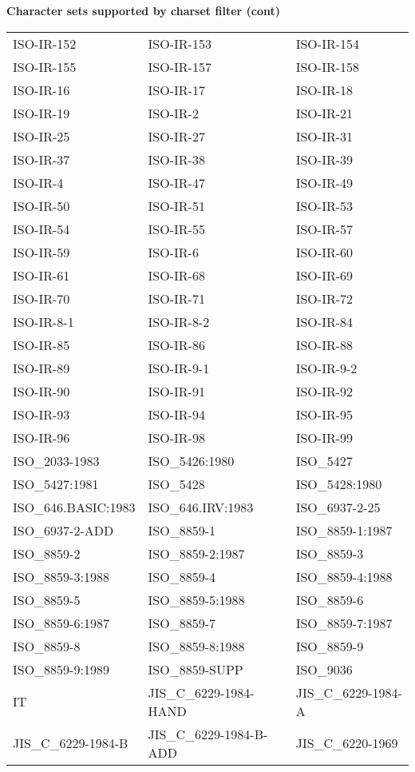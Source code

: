 \clearpage
{\bf Character sets supported by charset filter (cont)}
\bigskip\bigskip\noindent

\begin {tabular} {l l l}
ISO-IR-152 & ISO-IR-153 & ISO-IR-154 \\
ISO-IR-155 & ISO-IR-157 & ISO-IR-158 \\
ISO-IR-16 & ISO-IR-17 & ISO-IR-18 \\
ISO-IR-19 & ISO-IR-2 & ISO-IR-21 \\
ISO-IR-25 & ISO-IR-27 & ISO-IR-31 \\
ISO-IR-37 & ISO-IR-38 & ISO-IR-39 \\
ISO-IR-4 & ISO-IR-47 & ISO-IR-49 \\
ISO-IR-50 & ISO-IR-51 & ISO-IR-53 \\
ISO-IR-54 & ISO-IR-55 & ISO-IR-57 \\
ISO-IR-59 & ISO-IR-6 & ISO-IR-60 \\
ISO-IR-61 & ISO-IR-68 & ISO-IR-69 \\
ISO-IR-70 & ISO-IR-71 & ISO-IR-72 \\
ISO-IR-8-1 & ISO-IR-8-2 & ISO-IR-84 \\
ISO-IR-85 & ISO-IR-86 & ISO-IR-88 \\
ISO-IR-89 & ISO-IR-9-1 & ISO-IR-9-2 \\
ISO-IR-90 & ISO-IR-91 & ISO-IR-92 \\
ISO-IR-93 & ISO-IR-94 & ISO-IR-95 \\
ISO-IR-96 & ISO-IR-98 & ISO-IR-99 \\
ISO\_2033-1983 & ISO\_5426:1980 & ISO\_5427 \\
ISO\_5427:1981 & ISO\_5428 & ISO\_5428:1980 \\
ISO\_646.BASIC:1983 & ISO\_646.IRV:1983 & ISO\_6937-2-25 \\
ISO\_6937-2-ADD & ISO\_8859-1 & ISO\_8859-1:1987 \\
ISO\_8859-2 & ISO\_8859-2:1987 & ISO\_8859-3 \\
ISO\_8859-3:1988 & ISO\_8859-4 & ISO\_8859-4:1988 \\
ISO\_8859-5 & ISO\_8859-5:1988 & ISO\_8859-6 \\
ISO\_8859-6:1987 & ISO\_8859-7 & ISO\_8859-7:1987 \\
ISO\_8859-8 & ISO\_8859-8:1988 & ISO\_8859-9 \\
ISO\_8859-9:1989 & ISO\_8859-SUPP & ISO\_9036 \\
IT & JIS\_C\_6229-1984-HAND & JIS\_C\_6229-1984-A \\
JIS\_C\_6229-1984-B & JIS\_C\_6229-1984-B-ADD & JIS\_C\_6220-1969 \\

\end{tabular}
